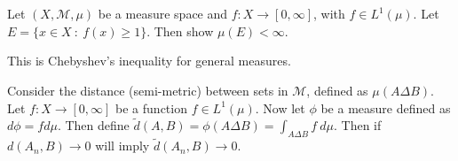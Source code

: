 
\chapter{}

\begin{note}[Warm up]
  Let $(X, \mathcal{M}, \mu)$ be a measure space and  $f: X \to [0, \infty]$, with $f \in L^{1}(\mu)$. Let $ E = \{ x \in X \ : \ f(x) \ge 1 \}$. Then show $\mu(E) < \infty$.

  This is Chebyshev's inequality for general measures.
\end{note}

\begin{remark}
  Consider the distance (semi-metric) between sets in $\mathcal{M}$, defined as $\mu(A \Delta B)$. Let $f: X \to [0, \infty]$ be a function $f \in L^{1}(\mu)$. Now let $\phi$ be a measure defined as $d \phi = f d \mu$. Then define $\tilde{ d}(A, B) = \phi(A \Delta B) = \int_{A \Delta B}  f \ d \mu$. Then if $d(A_n , B) \to 0$ will imply $\tilde{ d}(A_n, B) \to 0$.
\end{remark}

